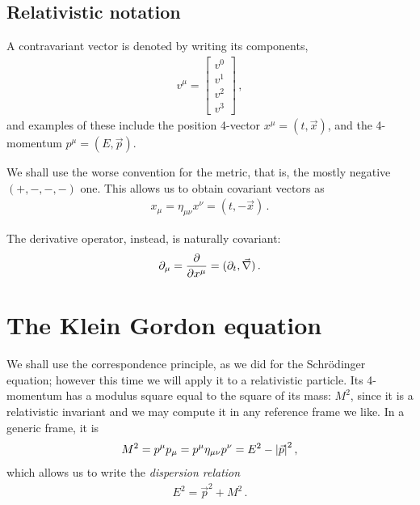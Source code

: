\documentclass[main.tex]{subfiles}
\begin{document}
\subsection{Relativistic notation}

A contravariant vector is denoted by writing its components, 
%
\begin{subequations}
\begin{align}
v^{\mu } = \left[\begin{array}{c}
v^{0} \\ 
v^{1} \\ 
v^{2} \\ 
v^{3}
\end{array}\right]
\,,
\end{align}
\end{subequations}
%
and examples of these include the position 4-vector \(x^{\mu } = (t, \vec{x})\), and the 4-momentum \(p^{\mu } = (E, \vec{p})\). 

We shall use the worse convention for the metric, that is, the mostly negative \((+,-,-,-)\) one. 
This allows us to obtain covariant vectors as 
%
\begin{align}
x_{\mu } = \eta_{\mu \nu } x^{\nu } = (t,-\vec{x})
\,.
\end{align}

The derivative operator, instead, is naturally covariant: 
%
\begin{align}
\partial_{\mu } = \pdv{}{x^{\mu }} = (\partial_{t}, \vec{\nabla})
\,.
\end{align}

\section{The Klein Gordon equation}

We shall use the correspondence principle, as we did for the Schrödinger equation; however this time we will apply it to a relativistic particle. Its 4-momentum has a modulus square equal to the square of its mass: \(M^2\), since it is a relativistic invariant and we may compute it in any reference frame we like. 
In a generic frame, it is
%
\begin{align}
M^2 = p^{\mu } p_{\mu } =  p^{\mu } \eta_{\mu \nu } p^{\nu } = E^2 - \abs{\vec{p}}^2
\,,
\end{align}
%
which allows us to write the \emph{dispersion relation} 
%
\begin{align}
E^2 = \vec{p}^2 + M^2
\,.
\end{align}
\end{document}
